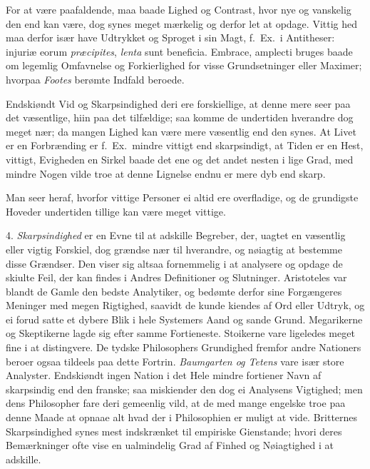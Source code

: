 \documentclass[12pt,a4paper]{article}
\newcommand{\opage}[1]{\marginnote{\footnotesize\textit{[#1]}}}
\begin{document}
For at være paafaldende, maa baade Lighed og Contrast, hvor nye og vanskelig den end kan
være, dog synes meget mærkelig og derfor let at opdage. Vittig%
\opage{156}hed maa derfor især have Udtrykket og Sproget i sin Magt, f.~Ex.\ i Antitheser: injuriæ
eorum \emph{præcipites}, \emph{lenta} sunt beneficia. Embrace, amplecti bruges baade om
legemlig Omfavnelse og Forkierlighed for visse Grundsetninger eller Maximer; hvorpaa
\emph{Footes} berømte Indfald beroede.

Endskiøndt Vid og Skarpsindighed deri ere forskiellige, at denne mere seer paa det
væsentlige, hiin paa det tilfældige; saa komme de undertiden hverandre dog meget nær; da
mangen Lighed kan være mere væsentlig end den synes. At Livet er en Forbrænding er
f.~Ex.\ mindre vittigt end skarpsindigt, at Tiden er en Hest, vittigt, Evigheden en Sirkel
baade det ene og det andet nesten i lige Grad, med mindre Nogen vilde troe at denne
Lignelse endnu er mere dyb end skarp.

Man seer heraf, hvorfor vittige Personer ei altid ere overfladige, og de grundigste
Hoveder undertiden tillige kan være meget vittige.

4. \emph{Skarpsindighed} er en Evne til at adskille Begreber, der, uagtet en væsentlig
eller vigtig Forskiel, dog grændse nær til hverandre, og nøiagtig at bestemme disse
Grændser. Den viser sig altsaa fornemmelig i at analysere og opdage de skiulte Feil, der
kan findes i Andres Definitioner og Slutninger. Aristoteles var blandt de Gamle den bedste
Analytiker, og bedømte derfor sine Forgængeres Meninger med megen Rigtighed, saavidt de
kunde kiendes af Ord eller Udtryk, og ei forud%
\opage{157}satte et dybere Blik i hele Systemers Aand og sande Grund. Megarikerne og Skeptikerne
lagde sig efter samme Fortieneste. Stoikerne vare ligeledes meget fine i at distingvere.
De tydske Philosophers Grundighed fremfor andre Nationers beroer ogsaa tildeels paa dette
Fortrin. \emph{Baumgarten og Tetens} vare især store Analyster. Endskiøndt ingen Nation i
det Hele mindre fortiener Navn af skarpsindig end den franske; saa miskiender den dog ei
Analysens Vigtighed; men dens Philosopher fare deri gemeenlig vild, at de med mange
engelske troe paa denne Maade at opnaae alt hvad der i Philosophien er muligt at vide.
Britternes Skarpsindighed synes mest indskrænket til empiriske Gienstande; hvori deres
Bemærkninger ofte vise en ualmindelig Grad af Finhed og Nøiagtighed i at adskille.
\end{document}

